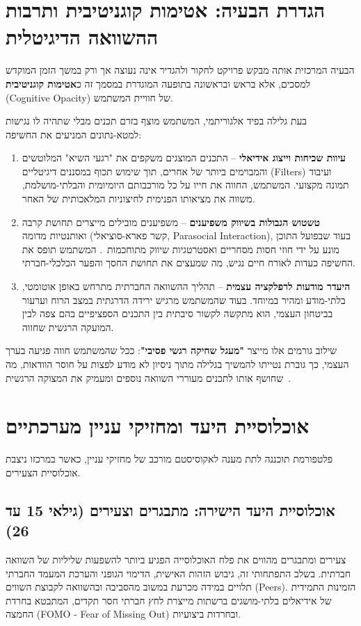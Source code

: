\section{הגדרת הבעיה: אטימות קוגניטיבית ותרבות ההשוואה הדיגיטלית}
\label{sec:intro_problem_statement}
הבעיה המרכזית אותה מבקש פרויקט \projectname{} לחקור ולהגדיר אינה נעוצה אך ורק במשך הזמן המוקדש למסכים, אלא בראש ובראשונה בתופעה המוגדרת במסמך זה כ\textbf{אטימות קוגניטיבית} (\textenglish{Cognitive Opacity}) של חוויית המשתמש.

בעת גלילה בפיד אלגוריתמי, המשתמש מוצף בזרם תכנים מבלי שתהיה לו נגישות למטא-נתונים המניעים את החשיפה:
\begin{enumerate}
    \item \textbf{עיוות שכיחות וייצוג אידיאלי} -- התכנים המוצגים משקפים את "רגעי השיא" המלוטשים והמבוימים ביותר של אחרים, תוך שימוש תכוף במסננים דיגיטליים (\textenglish{Filters}) ועיבוד תמונה מקצועי. המשתמש, החווה את חייו על כל מורכבותם היומיומית והבלתי-מושלמת, משווה את מציאותו הפנימית לחיצוניות המלאכותית של האחר.
    \item \textbf{טשטוש הגבולות בשיווק משפיענים} -- משפיענים מובילים מייצרים תחושת קרבה ואותנטיות מדומה (קשר פארא-סוציאלי, \textenglish{Parasocial Interaction}), בעוד שבפועל התוכן מונע על ידי חוזי חסות מסחריים ואסטרטגיות שיווק מתוחכמות~\cite{lou2019influencer}. המשתמש תופס את החשיפה כעדות לאורח חיים נגיש, מה שמעצים את תחושת החסך והפער הכלכלי-חברתי.
    \item \textbf{היעדר מודעות לרפלקציה עצמית} -- תהליך ההשוואה החברתית מתרחש באופן אוטומטי, בלתי-מודע ומהיר במיוחד. בעוד שהמשתמש מרגיש ירידה הדרגתית במצב הרוח וערעור בביטחון העצמי, הוא מתקשה לקשור סיבתית בין התכנים הספציפיים בהם צפה לבין המועקה הרגשית שחווה.
\end{enumerate}

שילוב גורמים אלו מייצר \textbf{"מעגל שחיקה רגשי פסיבי"}: ככל שהמשתמש חווה פגיעה בערך העצמי, כך גוברת נטייתו להמשיך בגלילה מתוך ניסיון לא מודע לפצות על חוסר הוודאות, מה שחושף אותו לתכנים מעוררי השוואה נוספים ומעמיק את המצוקה הרגשית~\cite{verduyn2017social, kross2013facebook}.

\section{אוכלוסיית היעד ומחזיקי עניין מערכתיים}
\label{sec:intro_stakeholders}
פלטפורמת \projectname{} תוכננה לתת מענה לאקוסיסטם מורכב של מחזיקי עניין, כאשר במרכזו ניצבת אוכלוסיית הצעירים.

\subsection{אוכלוסיית היעד הישירה: מתבגרים וצעירים (גילאי 15 עד 26)}
צעירים ומתבגרים מהווים את פלח האוכלוסייה הפגיע ביותר להשפעות שליליות של השוואה חברתית. בשלב התפתחותי זה, גיבוש הזהות האישית, הדימוי הגופני והערכת המעמד החברתי תלויים במידה מכרעת במשוב מהסביבה ובהשוואה לקבוצת השווים (\textenglish{Peers}). הזמינות התמידית של אידיאלים בלתי-מושגים ברשתות מייצרת לחץ חברתי חסר תקדים, המתבטא בחרדת החמצה (\textenglish{FOMO - Fear of Missing Out}) ובחרדות ביצועיות.

